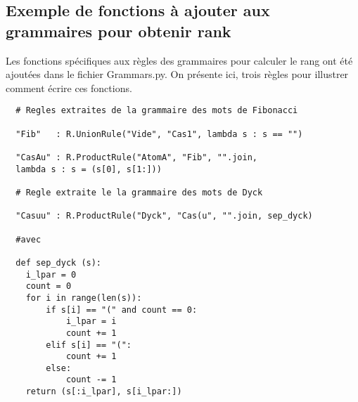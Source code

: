 \documentclass[a4paper, titlepage]{article}
\begin{document}
\pagebreak
\subsection{Exemple de fonctions à ajouter aux grammaires pour obtenir
  rank}

Les fonctions spécifiques aux règles des grammaires pour calculer le
rang ont été ajoutées dans le fichier Grammars.py. On présente ici,
trois règles pour illustrer comment écrire ces fonctions.\\
\begin{lstlisting}
  # Regles extraites de la grammaire des mots de Fibonacci

  "Fib"   : R.UnionRule("Vide", "Cas1", lambda s : s == "")

  "CasAu" : R.ProductRule("AtomA", "Fib", "".join,
  lambda s : s = (s[0], s[1:]))

  # Regle extraite le la grammaire des mots de Dyck

  "Casuu" : R.ProductRule("Dyck", "Cas(u", "".join, sep_dyck)

  #avec

  def sep_dyck (s):
    i_lpar = 0
    count = 0
    for i in range(len(s)):
        if s[i] == "(" and count == 0:
            i_lpar = i
            count += 1
        elif s[i] == "(":
            count += 1
        else:
            count -= 1
    return (s[:i_lpar], s[i_lpar:])

\end{lstlisting}
\vspace{1cm}
\end{document}
